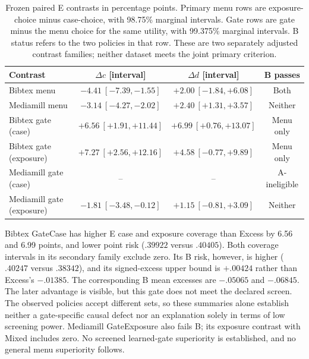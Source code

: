 \begin{table}[H]\centering\small
\setlength{\tabcolsep}{3pt}
\caption{Frozen paired E contrasts in percentage points. Primary menu rows are exposure-choice minus case-choice, with 98.75\% marginal intervals. Gate rows are gate minus the menu choice for the same utility, with 99.375\% marginal intervals. B status refers to the two policies in that row. These are two separately adjusted contrast families; neither dataset meets the joint primary criterion.}
\label{tab:v13-contrasts}
\begin{tabular}{lccc}\toprule
Contrast & $\Delta c$ [interval] & $\Delta d$ [interval] & B passes\\\midrule
Bibtex menu & $-4.41\ [-7.39,-1.55]$ & $+2.00\ [-1.84,+6.08]$ & Both \\
Mediamill menu & $-3.14\ [-4.27,-2.02]$ & $+2.40\ [+1.31,+3.57]$ & Neither \\
\midrule
Bibtex gate (case) & $+6.56\ [+1.91,+11.44]$ & $+6.99\ [+0.76,+13.07]$ & Menu only \\
Bibtex gate (exposure) & $+7.27\ [+2.56,+12.16]$ & $+4.58\ [-0.77,+9.89]$ & Menu only \\
Mediamill gate (case) & -- & -- & A-ineligible \\
Mediamill gate (exposure) & $-1.81\ [-3.48,-0.12]$ & $+1.15\ [-0.81,+3.09]$ & Neither \\
\bottomrule\end{tabular}
\end{table}

Bibtex GateCase has higher E case and exposure coverage than Excess by 6.56 and 6.99 points, and lower point risk ($.39922$ versus $.40405$). Both coverage intervals in its secondary family exclude zero. Its B risk, however, is higher ($.40247$ versus $.38342$), and its signed-excess upper bound is $+.00424$ rather than Excess's $-.01385$. The corresponding B mean excesses are $-.05065$ and $-.06845$. The later advantage is visible, but this gate does not meet the declared screen. The observed policies accept different sets, so these summaries alone establish neither a gate-specific causal defect nor an explanation solely in terms of low screening power. Mediamill GateExposure also fails B; its exposure contrast with Mixed includes zero. No screened learned-gate superiority is established, and no general menu superiority follows.

